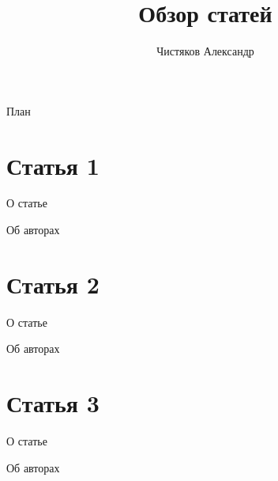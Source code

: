 \documentclass[11pt,pdf,hyperref=unicode,hyperref={bookmarks=false}]{beamer}
\author{Чистяков Александр}
\institute{группа 5126}
\title{Обзор статей}
\begin{document}
  \begin{frame}
    \maketitle
  \end{frame}
  \begin{frame}{План}
    \tableofcontents
  \end{frame}
  \section{Статья 1}
    \begin{frame}{О статье}
    \end{frame}
    \begin{frame}{Об авторах}
    \end{frame}
  \section{Статья 2}
    \begin{frame}{О статье}
    \end{frame}
    \begin{frame}{Об авторах}
    \end{frame}
  \section{Статья 3}
    \begin{frame}{О статье}
    \end{frame}
    \begin{frame}{Об авторах}
    \end{frame}
\end{document}
